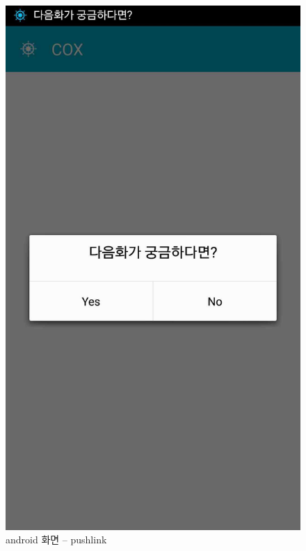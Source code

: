 \documentclass[chapter,oneside]{oblivoir}
\begin{document}
\begin{enumerate}
    \begin{figure}[h!]
    \centering
    \includegraphics{pic/chp7/img1013}
    \caption{android 화면 – pushlink}
    \end{figure}


\end{enumerate}
\end{document}
